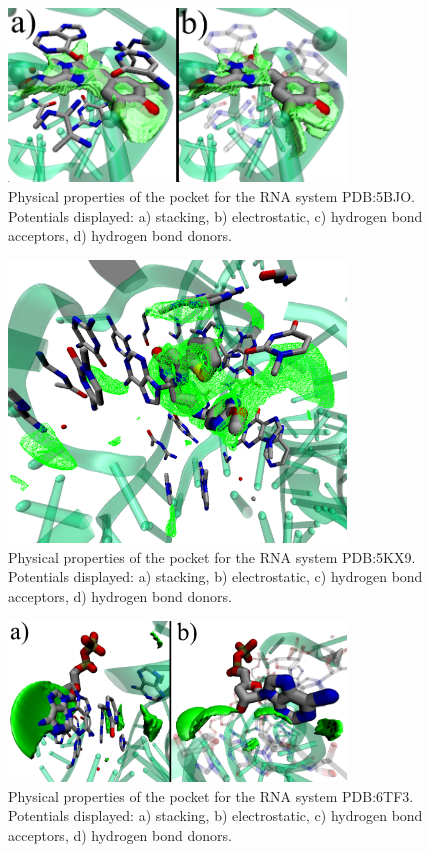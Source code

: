     \begin{figure}[H]
      \centering
      \includegraphics[width=0.8\textwidth]{figures/results/benchmark_rna/5bjo.png}
      \caption{\label{fig:benchmark/5bjo} Physical properties of the pocket for the RNA system PDB:5BJO. Potentials displayed: a) stacking, b) electrostatic, c) hydrogen bond acceptors, d) hydrogen bond donors.}
    \end{figure}

    \begin{figure}[H]
      \centering
      \includegraphics[width=0.8\textwidth]{figures/results/benchmark_rna/5kx9.png}
      \caption{\label{fig:benchmark/5kx9} Physical properties of the pocket for the RNA system PDB:5KX9. Potentials displayed: a) stacking, b) electrostatic, c) hydrogen bond acceptors, d) hydrogen bond donors.}
    \end{figure}

    \begin{figure}[H]
      \centering
      \includegraphics[width=0.8\textwidth]{figures/results/benchmark_rna/6tf3.png}
      \caption{\label{fig:benchmark/6tf3} Physical properties of the pocket for the RNA system PDB:6TF3. Potentials displayed: a) stacking, b) electrostatic, c) hydrogen bond acceptors, d) hydrogen bond donors.}
    \end{figure}

